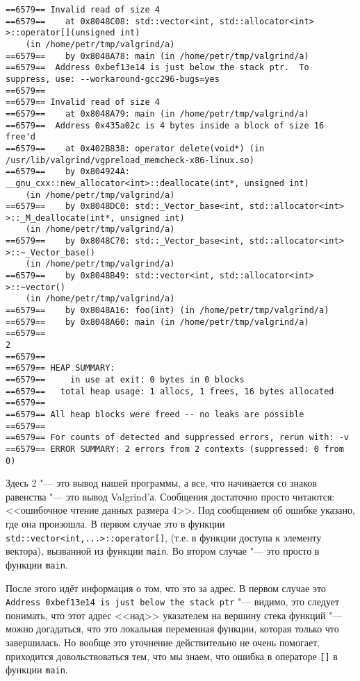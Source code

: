 {\footnotesize
\begin{verbatim}
==6579== Invalid read of size 4
==6579==    at 0x8048C08: std::vector<int, std::allocator<int> >::operator[](unsigned int) 
    (in /home/petr/tmp/valgrind/a)
==6579==    by 0x8048A78: main (in /home/petr/tmp/valgrind/a)
==6579==  Address 0xbef13e14 is just below the stack ptr.  To suppress, use: --workaround-gcc296-bugs=yes
==6579== 
==6579== Invalid read of size 4
==6579==    at 0x8048A79: main (in /home/petr/tmp/valgrind/a)
==6579==  Address 0x435a02c is 4 bytes inside a block of size 16 free'd
==6579==    at 0x402B838: operator delete(void*) (in /usr/lib/valgrind/vgpreload_memcheck-x86-linux.so)
==6579==    by 0x804924A: __gnu_cxx::new_allocator<int>::deallocate(int*, unsigned int) 
    (in /home/petr/tmp/valgrind/a)
==6579==    by 0x8048DC0: std::_Vector_base<int, std::allocator<int> >::_M_deallocate(int*, unsigned int) 
    (in /home/petr/tmp/valgrind/a)
==6579==    by 0x8048C70: std::_Vector_base<int, std::allocator<int> >::~_Vector_base() 
    (in /home/petr/tmp/valgrind/a)
==6579==    by 0x8048B49: std::vector<int, std::allocator<int> >::~vector() 
    (in /home/petr/tmp/valgrind/a)
==6579==    by 0x8048A16: foo(int) (in /home/petr/tmp/valgrind/a)
==6579==    by 0x8048A60: main (in /home/petr/tmp/valgrind/a)
==6579== 
2
==6579== 
==6579== HEAP SUMMARY:
==6579==     in use at exit: 0 bytes in 0 blocks
==6579==   total heap usage: 1 allocs, 1 frees, 16 bytes allocated
==6579== 
==6579== All heap blocks were freed -- no leaks are possible
==6579== 
==6579== For counts of detected and suppressed errors, rerun with: -v
==6579== ERROR SUMMARY: 2 errors from 2 contexts (suppressed: 0 from 0)                                                                                                                                                                                                        \end{verbatim}
\par
}
\noindent
Здесь 2 "--- это вывод нашей программы, а все, что начинается со знаков равенства "--- это вывод Val\-grind'а. 
Сообщения достаточно просто читаются: <<ошибочное чтение данных размера 4>>. 
Под сообщением об ошибке указано, где она произошла. В первом случае это в функции \verb`std::vector<int,...>::operator[]`, 
(т.е. в функции доступа к элементу вектора), вызванной из функции \verb`main`. Во втором случае "--- это просто в функции \verb`main`.

После этого идёт информация о том, что это за адрес. В первом случае это \texttt{Address 0xbef13e14 is just below the stack ptr} "---
видимо, это следует понимать, что этот адрес <<над>> указателем на вершину стека функций "--- можно догадаться, что это локальная переменная
функции, которая только что завершилась. Но вообще это уточнение действительно не очень помогает, приходится довольствоваться тем, что мы знаем, что
ошибка в операторе \verb`[]` в функции \verb`main`.

